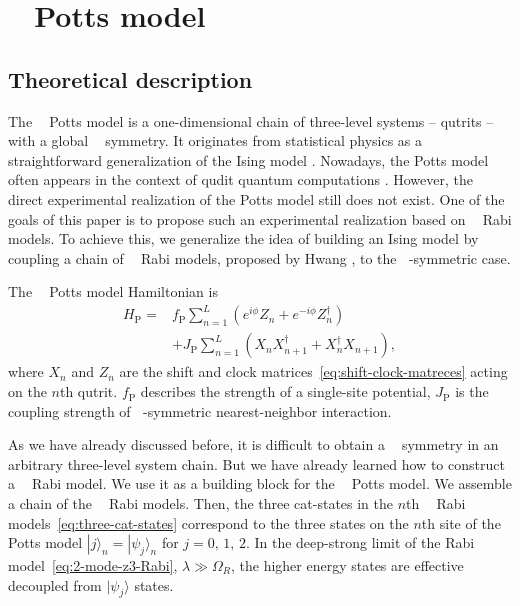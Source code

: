 \documentclass[reprint, aps, prx, amsmath, amssymb, longbibliography, superscriptaddress]{revtex4-2}
\DeclareMathOperator{\Zthree}{\mathbb{Z}_3}
\DeclareMathOperator{\Ztwo}{\mathbb{Z}_2}
\begin{document}
\section{\texorpdfstring{$\Zthree$}{Z3} Potts model}
\label{sec:potts-model}

\subsection{Theoretical description}
\label{sec:theoretical-potts}


The $\Zthree$ Potts model \cite{wu_potts_1982} is a one-dimensional chain of three-level systems -- qutrits -- with a global $\Zthree$ symmetry. It  originates from statistical physics as a straightforward generalization of the Ising model  \cite{wu_potts_1982,baxter_critical_1982}. Nowadays, the Potts model often appears in the context of qudit quantum computations \cite{aharonov_polynomial_2007,okada_efficient_2019}. However, the direct experimental realization of the Potts model still does not exist. One of the goals of this paper is to propose such an experimental realization based on $\Zthree$ Rabi models. To achieve this, we generalize the idea of building an Ising model by coupling a chain of $\Ztwo$ Rabi models, proposed by Hwang \cite{hwang_largescale_2013}, to the $\Zthree$-symmetric case.

The $\Zthree$ Potts model Hamiltonian is
\begin{equation}
\begin{aligned}
\label{eq:potts-hamiltonian}
H_{\text{P}} =& f_{\text{P}} \sum\limits_{n=1}^L \left(e^{i\phi}Z_n + e^{-i\phi}Z_n^{\dagger}\right) \\
  &+  J_{\text{P}} \sum\limits_{n=1}^L \left( X_n X_{n+1}^{\dagger} + X_n^{\dagger} X_{n+1}\right),
\end{aligned}
\end{equation}
where $X_n$ and $Z_n$ are the shift and clock matrices~\eqref{eq:shift-clock-matreces} acting on the $n$th qutrit. $f _\text{P}$ describes the strength of a single-site potential, $J_{\text{P}}$ is the coupling strength of $\Zthree$-symmetric nearest-neighbor interaction.

As we have already discussed before, it is difficult to obtain a $\Zthree$ symmetry in an arbitrary three-level system chain. But we have already learned how to construct a $\Zthree$ Rabi model. We use it as a building block for the $\Zthree$ Potts model. We assemble a chain of the $\Zthree$ Rabi models. Then, the three cat-states in the $n$th $\Zthree$ Rabi models~\eqref{eq:three-cat-states} correspond to the three states on the $n$th site of the Potts model $ |j\rangle_n = |\psi_j\rangle_n $ for $j=0,\, 1,\, 2$. In the deep-strong limit of the Rabi model~\eqref{eq:2-mode-z3-Rabi}, $ \lambda \gg \Omega_R$,  the higher energy states are effective decoupled from $|\psi_j\rangle$ states.
\end{document}
